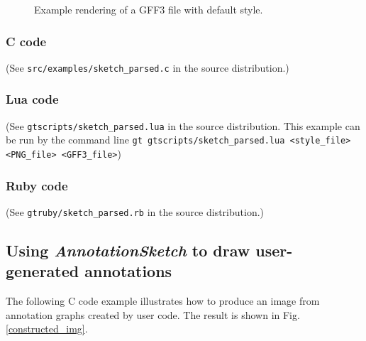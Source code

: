 \documentclass[a4paper]{scrreprt}
\begin{document}
\begin{figure}
\caption{Example rendering of a GFF3 file with default style.}
\label{parsed_img}
\end{figure}

\subsubsection{C code}
(See \texttt{src/examples/sketch\_parsed.c} in the source distribution.)

\subsubsection{Lua code}
(See \texttt{gtscripts/sketch\_parsed.lua} in the source distribution. This example can be run by the command line \texttt{gt gtscripts/sketch\_parsed.lua <style\_file> <PNG\_file> <GFF3\_file>})

\subsubsection{Ruby code}
(See \texttt{gtruby/sketch\_parsed.rb} in the source distribution.)


\subsection{Using \emph{AnnotationSketch} to draw user-generated annotations}
The following C code example illustrates how to produce an image from annotation graphs created by user code.
 The result is shown in Fig. \ref{constructed_img}.
\end{document}
